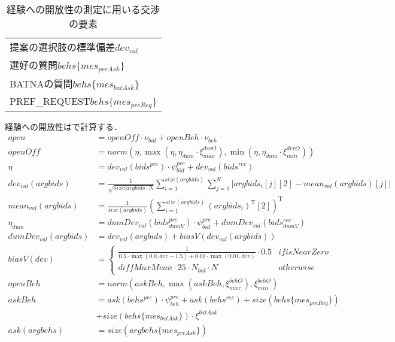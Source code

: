 \begin{table}[tb]
    \centering
    \caption{経験への開放性の測定に用いる交渉の要素}
    \begin{tabular}{l} \toprule
        提案の選択肢の標準偏差$dev_{val}$ \\
        選好の質問$behs\{mes_{\mathit{preAsk}}\}$  \\
        BATNAの質問$behs\{mes_{\mathit{batAsk}}\}$ \\
        PREF\_REQUEST$behs\{mes_{\mathit{preReq}}\}$ \\ \bottomrule
    \end{tabular}
    \label{tab:openness}
\end{table}

経験への開放性はで計算する．
\begin{align}
    open &= \mathit{openOff} \cdot \nu_{\mathit{bid}} + openBeh \cdot \nu_{beh} \label{eq:openness} \\
    \mathit{openOff} &= norm \left(\eta, \max \left(\eta, \eta_{dum} \cdot \xi_{max}^{devO}\right), \min \left(\eta, \eta_{dum} \cdot \xi_{min}^{devO}\right) \right) \nonumber \\
    \eta &= dev_{val}(bids^{pre}) \cdot \psi_{\mathit{bid}}^{pre} + dev_{val}(bids^{rec}) \nonumber \\
    dev_{val}(argbids) &= \frac{1}{\sqrt{size(argbids \cdot N}}\sum_{i = 1}^{size(argbids)} \sum_{j = 1}^{N} \left| argbids_i[j][2] - mean_{val}(argbids)[j] \right| \nonumber \\
    mean_{val}(argbids) &= \frac{1}{size(argbids)}\left(\sum_{i = 1}^{size(argbids)} (argbids_i)^{\mathrm{T}}[2] \right)^{\mathrm{T}} \nonumber \\
    \eta_{dum} &= dumDev_{val}(bids_{dumV}^{pre}) \cdot \psi_{\mathit{bid}}^{pre} + dumDev_{val}(bids_{dumV}^{rec}) \nonumber \\
    dumDev_{val}(argbids) &= dev_{val}(argbids) + biasV(dev_{val}(argbids)) \nonumber \\
    biasV(dev) &= 
    \begin{cases*}
        \frac{1}{0.5 \cdot \max (0.0, dev - 1.5) + 0.01 \cdot \max (0.01, dev)} \cdot 0.5 & if isNearZero \\
        \mathit{diffMaxMean} \cdot 25 \cdot N_{bid} \cdot N & otherwise 
    \end{cases*} \nonumber \\
    openBeh &= norm\left( askBeh, \max \left( askBeh, \xi_{max}^{\mathit{behO}}\right), \xi_{min}^{\mathit{behO}} \right) \nonumber \\
    askBeh &=  ask(behs^{pre}) \cdot \psi_{beh}^{pre} + ask(behs^{rec}) + size(behs\{mes_{\mathit{preReq}}\}) \nonumber \\
    &+ size(behs\{mes_{\mathit{batAsk}}\}) \cdot \xi^{batAsk} \nonumber \\
    ask(argbehs) &= size(argbehs\{mes_{\mathit{preAsk}}\}) \nonumber
\end{align}

